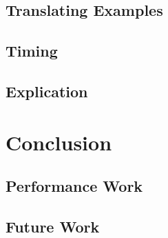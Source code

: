\subsection{Translating Examples}

\subsection{Timing}

\subsection{Explication}

\section{Conclusion}
\label{sec:conclusion}

\subsection{Performance Work}

\subsection{Future Work}